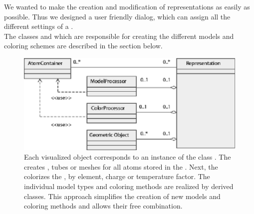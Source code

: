 We wanted to make the creation and modification of representations as easily as possible.
Thus we designed a user friendly dialog, which can assign all
the different settings of a .\\
The classes  and  which are responsible 
for creating the different models and coloring schemes are described in the
section below.
\begin{figure}[ht] %
\centering
\includegraphics[width=1.\textwidth]{representation.eps}
\caption[UML diagram for the  class]
{Each visualized object corresponds to an instance of the class 
. The  creates 
, \eg tubes or meshes for all atoms stored in the
. Next, the  colorizes the 
, \eg by element, charge or temperature factor. The
individual model types and coloring methods are realized by derived classes.
This approach simplifies the creation of new models and coloring methods and 
allows their free combination.}
\label{fig:representation}
\end{figure}

